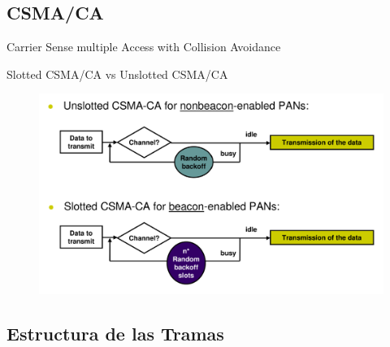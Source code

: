 \documentclass[aspectratio=169]{beamer}
\begin{document}
\subsection[CSMA/CA]{CSMA/CA}

\begin{frame}[T]{Carrier Sense multiple Access with Collision Avoidance}

Slotted CSMA/CA vs Unslotted CSMA/CA

\vspace{10px}

		\begin{figure}[H]
			\includegraphics[height=.8\textheight]{./imagenes/CSMA-CA}\\
		\end{figure}
\end{frame}


\subsection[Tramas]{Estructura de las Tramas}
\end{document}
